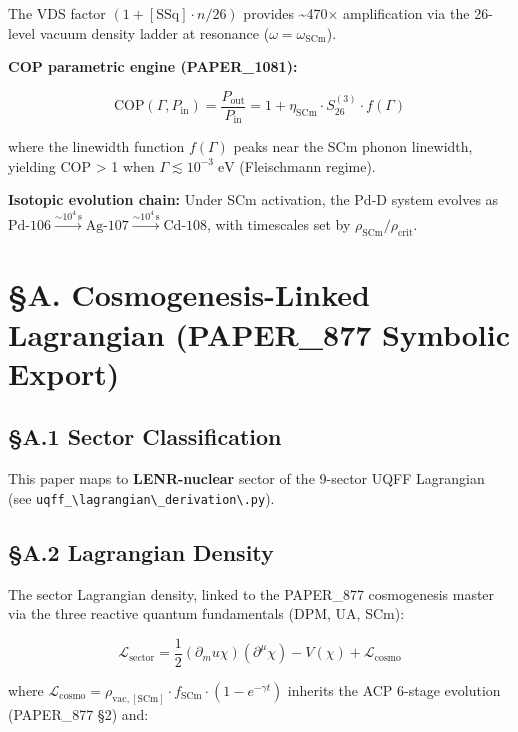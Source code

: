 \documentclass[12pt,a4paper]{article}
\begin{document}
The VDS factor $(1 + [\text{SSq}] \cdot n/26)$ provides \textasciitilde{}470$\times$ amplification via the 26-level vacuum density ladder at resonance ($\omega = \omega_{\text{SCm}}$).

\textbf{COP parametric engine (PAPER\_1081):}

\begin{equation}
\text{COP}(\Gamma, P_{\text{in}}) = \frac{P_{\text{out}}}{P_{\text{in}}} = 1 + \eta_{\text{SCm}} \cdot S_{26}^{(3)} \cdot f(\Gamma)
\end{equation}

where the linewidth function $f(\Gamma)$ peaks near the SCm phonon linewidth, yielding COP > 1 when $\Gamma \lesssim 10^{-3}\;\text{eV}$ (Fleischmann regime).

\textbf{Isotopic evolution chain:} Under SCm activation, the Pd-D system evolves as $\text{Pd-106} \xrightarrow{\sim 10^4\,\text{s}} \text{Ag-107} \xrightarrow{\sim 10^4\,\text{s}} \text{Cd-108}$, with timescales set by $\rho_{\text{SCm}}/\rho_{\text{crit}}$.

\section{\S{}A. Cosmogenesis-Linked Lagrangian (PAPER\_877 Symbolic Export)}

\subsection{\S{}A.1 Sector Classification}

This paper maps to \textbf{LENR-nuclear} sector of the 9-sector UQFF Lagrangian (see \texttt{uqff\_\textbackslash {lagrangian\textbackslash \_derivation\textbackslash }.py}).

\subsection{\S{}A.2 Lagrangian Density}

The sector Lagrangian density, linked to the PAPER\_877 cosmogenesis master via the three reactive quantum fundamentals (DPM, UA, SCm):

\begin{equation}
\mathcal{L}_{\mathrm{sector}} = \frac{1}{2}(\partial_mu \chi)(\partial^\mu \chi) - V(\chi) + \mathcal{L}_{\mathrm{cosmo}}
\end{equation}

where $\mathcal{L}_{\mathrm{cosmo}} = \rho_{\mathrm{vac,[SCm]}} \cdot f_{\mathrm{SCm}} \cdot (1 - e^{-\gamma t})$ inherits the ACP 6-stage evolution (PAPER\_877 \S{}2) and:
\end{document}
